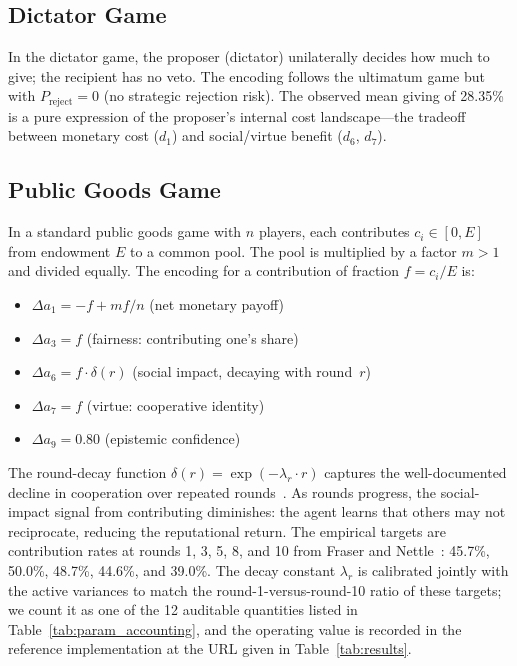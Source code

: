 \documentclass[journal]{IEEEtran}
\begin{document}
\subsection{Dictator Game}

In the dictator game, the proposer (dictator) unilaterally decides how much to give; the recipient has no veto.
The encoding follows the ultimatum game but with $P_{\text{reject}} = 0$ (no strategic rejection risk).
The observed mean giving of 28.35\%~\cite{engel2011} is a pure expression of the proposer's internal cost landscape---the tradeoff between monetary cost ($d_1$) and social/virtue benefit ($d_6$, $d_7$).

\subsection{Public Goods Game}

In a standard public goods game with $n$ players, each contributes $c_i \in [0, E]$ from endowment $E$ to a common pool.
The pool is multiplied by a factor $m > 1$ and divided equally.
The encoding for a contribution of fraction $f = c_i/E$ is:
\begin{itemize}
    \item $\Delta a_1 = -f + mf/n$ (net monetary payoff)
    \item $\Delta a_3 = f$ (fairness: contributing one's share)
    \item $\Delta a_6 = f \cdot \delta(r)$ (social impact, decaying with round~$r$)
    \item $\Delta a_7 = f$ (virtue: cooperative identity)
    \item $\Delta a_9 = 0.80$ (epistemic confidence)
\end{itemize}
The round-decay function $\delta(r) = \exp(-\lambda_r \cdot r)$ captures the well-documented decline in cooperation over repeated rounds~\cite{fehr1999,camerer2003}.
As rounds progress, the social-impact signal from contributing diminishes: the agent learns that others may not reciprocate, reducing the reputational return.
The empirical targets are contribution rates at rounds 1, 3, 5, 8, and 10 from Fraser and Nettle~\cite{fraser2020}: 45.7\%, 50.0\%, 48.7\%, 44.6\%, and 39.0\%.
The decay constant $\lambda_r$ is calibrated jointly with the active variances to match the round-1-versus-round-10 ratio of these targets; we count it as one of the 12 auditable quantities listed in Table~\ref{tab:param_accounting}, and the operating value is recorded in the reference implementation at the URL given in Table~\ref{tab:results}.
\end{document}

